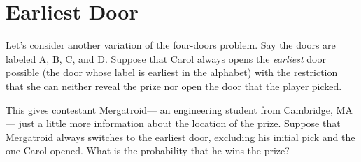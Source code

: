 \documentclass[12pt]{article}
\begin{document}
\begin{enumerate}
\end{enumerate}


\newpage

\section{Earliest Door}

Let's consider another variation of the four-doors problem.  Say the
doors are labeled A, B, C, and D.  Suppose that Carol always opens the
\textit{earliest} door possible (the door whose label is earliest in
the alphabet) with the restriction that she can neither reveal the
prize nor open the door that the player picked.

This gives contestant Mergatroid--- an engineering student from
Cambridge, MA--- just a little more information about the location of
the prize.  Suppose that Mergatroid always switches to the earliest
door, excluding his initial pick and the one Carol opened.  What is
the probability that he wins the prize?

\end{document}
